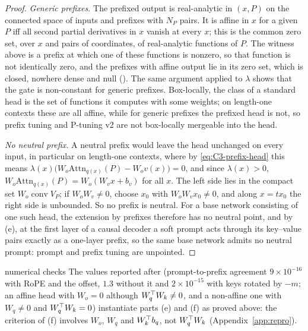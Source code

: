 \begin{proof}
\emph{Generic prefixes.} The prefixed output is real-analytic in $(x,P)$ on the connected space of inputs and prefixes with $N_P$
pairs. It is affine in $x$ for a given $P$ iff all second partial derivatives in $x$ vanish at every $x$; this is the common zero
set, over $x$ and pairs of coordinates, of real-analytic functions of $P$. The witness above is a prefix at which one of these
functions is nonzero, so that function is not identically zero, and the prefixes with affine output lie in its zero set, which
is closed, nowhere dense and null (). The same argument applied to $\lambda$ shows that the gate is non-constant
for generic prefixes. Box-locally, the class of a standard head is the set of functions it computes with some weights; on
length-one contexts these are all affine, while for generic prefixes the prefixed head is not, so prefix tuning and P-tuning v2
are not box-locally mergeable into the head.

\emph{No neutral prefix.} A neutral prefix would leave the head unchanged on every input, in particular on length-one contexts,
where by \eqref{eq:C3-prefix-head} this means $\lambda(x)\big(W_o\mathrm{Attn}_{q(x)}(P)-W_ov(x)\big)=0$, and since $\lambda(x)>0$,
$W_o\mathrm{Attn}_{q(x)}(P)=W_o(W_vx+b_v)$ for all $x$. The left side lies in the compact set $W_o\operatorname{conv}V_P$; if
$W_oW_v\ne0$, choose $x_0$ with $W_oW_vx_0\ne0$, and along $x=tx_0$ the right side is unbounded. So no prefix is neutral. For a
base network consisting of one such head, the extension by prefixes therefore has no neutral point, and by (e), at the first layer
of a causal decoder a soft prompt acts through its key--value pairs exactly as a one-layer prefix, so the same base network admits
no neutral prompt: prompt and prefix tuning are unpointed.
\end{proof}

\begin{remark*}{numerical checks}
The values reported after  (prompt-to-prefix agreement $9\times10^{-16}$ with RoPE and the offset, $1.3$
without it and $2\times10^{-15}$ with keys rotated by $-m$; an affine head with $W_o=0$ although $W_q^{\top} W_k\ne0$, and a non-affine
one with $W_q\ne0$ and $W_q^{\top} W_k=0$) instantiate parts (e) and (f) as proved above: the criterion of (f) involves $W_o$, $W_q$ and
$W_k^{\top} b_q$, not $W_q^{\top} W_k$ (Appendix~\ref{app:repro}).
\end{remark*}
